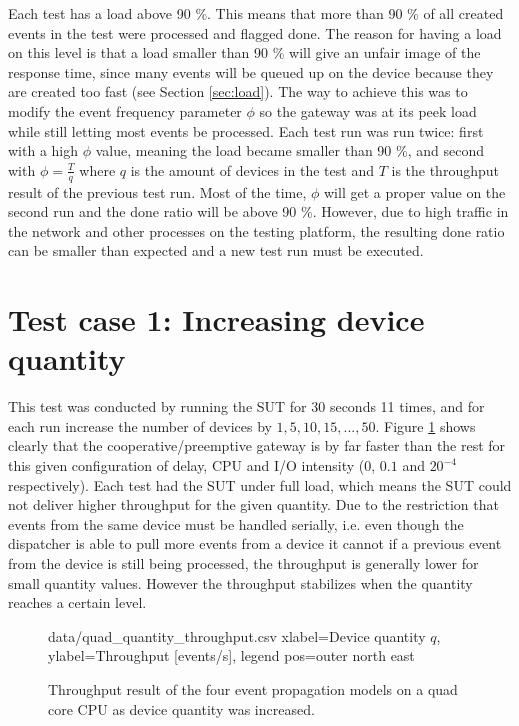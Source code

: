 Each test has a load above 90 \%. This means that more than 90 \% of all
created events in the test were processed and flagged done. The reason for
having a load on this level is that a load smaller than 90 \% will give an
unfair image of the response time, since many events will be queued up on the
device because they are created too fast (see Section \ref{sec:load}). The way
to achieve this was to modify the event frequency parameter $\phi$ so the
gateway was at its peek load while still letting most events be processed. Each
test run was run twice: first with a high $\phi$ value, meaning the load became
smaller than 90 \%, and second with $\phi = \frac{T}{q}$ where $q$ is the
amount of devices in the test and $T$ is the throughput result of the previous
test run. Most of the time, $\phi$ will get a proper value on the second run
and the done ratio will be above 90 \%. However, due to high traffic in the
network and other processes on the testing platform, the resulting done ratio
can be smaller than expected and a new test run must be executed.

\section{Test case 1: Increasing device quantity}

This test was conducted by running the SUT for 30 seconds 11 times, and for
each run increase the number of devices by $1, 5, 10, 15, ..., 50$. Figure
\ref{fig:quad_quantity_throughput} shows clearly that the
cooperative/preemptive gateway is by far faster than the rest for this given
configuration of delay, CPU and I/O intensity (0, $0.1$ and $20^{-4}$
respectively). Each test had the SUT under full load, which means the SUT could
not deliver higher throughput for the given quantity. Due to the restriction
that events from the same device must be handled serially, i.e. even though the
dispatcher is able to pull more events from a device it cannot if a previous
event from the device is still being processed, the throughput is generally
lower for small quantity values. However the throughput stabilizes when the
quantity reaches a certain level.

\begin{figure}[h!]
    \centering
    \performanceplot
    {data/quad_quantity_throughput.csv}
    {
        xlabel=Device quantity $q$,
        ylabel={Throughput [events/s]},
        legend pos=outer north east
    }

    \caption[Throughput result when device quantity was increased.]{Throughput result of the four event propagation models on a quad
    core CPU as device quantity was increased.}

    \label{fig:quad_quantity_throughput}
\end{figure}

